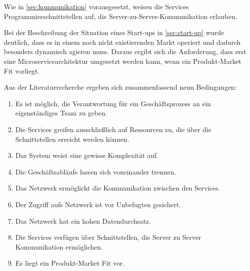Wie in \cref{sec:kommunikation} vorausgesetzt, weisen die Services Programmierschnittstellen auf, die Server-zu-Server-Kommunikation erlauben.

Bei der Beschreibung der Situation eines Start-ups in \cref{sec:start-up} wurde deutlich, dass es in einem noch nicht existierenden Markt operiert und dadurch besonders dynamisch agieren muss. Daraus ergibt sich die Anforderung, dass erst eine Microservicearchitektur umgesetzt werden kann, wenn ein Produkt-Market Fit vorliegt.

Aus der Literaturrecherche ergeben sich zusammenfassend neun Bedingungen:
\begin{enumerate}
	\item Es ist möglich, die Verantwortung für ein Geschäftsprozess an ein eigenständiges Team zu geben.
	\item Die Services greifen ausschließlich auf Ressourcen zu, die über die Schnittstellen erreicht werden können.
	\item Das System weist eine gewisse Komplexität auf.
	\item Die Geschäftsabläufe lassen sich voneinander trennen.
	\item Das Netzwerk ermöglicht die Kommunikation zwischen den Services.
	\item Der Zugriff aufs Netzwerk ist vor Unbefugten gesichert.
	\item Das Netzwerk hat ein hohen Datendurchsatz.
	\item Die Services verfügen über Schnittstellen, die Server zu Server Kommunikation ermöglichen.
	\item Es liegt ein Produkt-Market Fit vor.
\end{enumerate}
